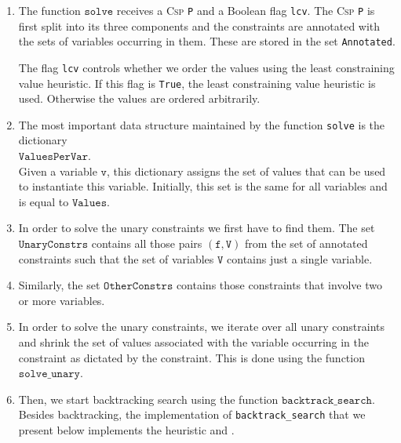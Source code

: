 \begin{enumerate}
\item The function $\texttt{solve}$ receives a \textsc{Csp} \texttt{P} and a Boolean flag \texttt{lcv}.  
      The \textsc{Csp} \texttt{P} is first split into its
      three components and the constraints are annotated with the sets of variables occurring in them.
      These  are stored in the set \texttt{Annotated}.

      The flag \texttt{lcv} controls whether we order the values using the least constraining value heuristic.
      If this flag is \texttt{True}, the least constraining value heuristic is used.  Otherwise the values
      are ordered arbitrarily.
\item The most important data structure maintained by the function \texttt{solve} is the dictionary
      \\[0.2cm]
      \hspace*{1.3cm}
      $\texttt{ValuesPerVar}$.  
      \\[0.2cm]
      Given a variable $\texttt{v}$, this dictionary assigns the set of values that can be used to instantiate this
      variable.  Initially, this set is the same for all variables and is equal to $\texttt{Values}$.
\item In order to solve the unary constraints we first have to find them.
      The set $\texttt{UnaryConstrs}$ contains all those pairs $(\texttt{f}, \texttt{V})$ from the set of
      annotated constraints such that the set of variables $\texttt{V}$ contains just a
      single variable. 
\item Similarly, the set $\texttt{OtherConstrs}$ contains those constraints that involve two or more variables.
\item In order to solve the unary constraints, we iterate over all unary constraints and shrink the set of
      values associated with the variable occurring in the constraint as dictated by the constraint.
      This is done using the function $\texttt{solve\_unary}$.
\item Then, we start backtracking search using the function $\texttt{backtrack\_search}$.  
      Besides backtracking, the implementation of \texttt{backtrack\_search} that we present below
      implements the  heuristic and .
\end{enumerate}

